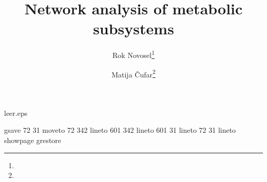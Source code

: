 \begin{filecontents}{leer.eps}

gsave
72 31 moveto
72 342 lineto
601 342 lineto
601 31 lineto
72 31 lineto
showpage
grestore
\end{filecontents}
%
\documentclass[epj]{svjour}
%
\usepackage{graphicx}
\usepackage{epstopdf}
%

%
\title{Network analysis of metabolic subsystems}
\author{Rok Novosel\thanks{} \and Matija
  \v{C}ufar\thanks{}
}                     %
%
%
%


\maketitle

\section{Introduction}
\label{sec:intro}

Since the turn of the century, life sciences have been evolving
rapidly. Advances in data acquisition, storage and analysis technology have
allowed scientist to gather immense amounts of data and build complex models
from it~\cite{modsys}. These complicated models have brought people of various
backgrounds, such as physics, mathematics and computer science into the field
of biology.

